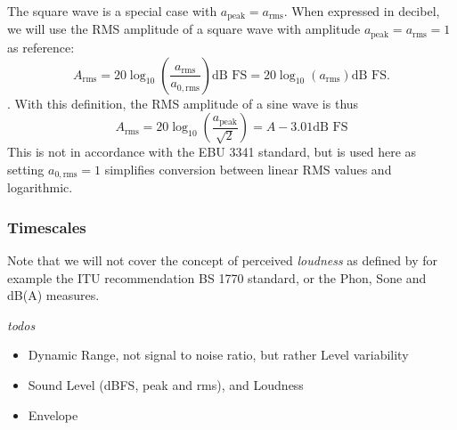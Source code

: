 \documentclass[../main2.tex]{subfiles}
\begin{document}
The square wave is a special case with $a_\text{peak} = a_\text{rms}$. When expressed in decibel, we will use the RMS amplitude of a square wave with amplitude $a_\text{peak} = a_\text{rms} = 1$ as reference:
\begin{equation}
A_\text{rms} =
20 \log_{10} \left( \frac{a_\text{rms}}{a_{0, \text{rms}}} \right) \text{dB FS} =
20 \log_{10} \left( a_\text{rms} \right) \text{dB FS}.
\end{equation}.
With this definition, the RMS amplitude of a sine wave is thus
\begin{equation}
A_\text{rms} = 20\log_{10} \left( \frac{a_\text{peak}}{\sqrt 2} \right) = A - 3.01 \text{dB FS}
\end{equation}
This is not in accordance with the EBU 3341 standard, but is used here as setting $a_{0, \text{rms}} = 1$ simplifies conversion between linear RMS values and logarithmic.

\subsubsection{Timescales}
Note that we will not cover the concept of perceived \emph{loudness} as defined by for example the ITU recommendation BS 1770 standard, or the Phon, Sone and dB(A) measures.

\emph{todos}
\begin{itemize}
	\item Dynamic Range, not signal to noise ratio, but rather Level variability
	\item Sound Level (dBFS, peak and rms), and Loudness
	\item Envelope
\end{itemize}
\end{document}
